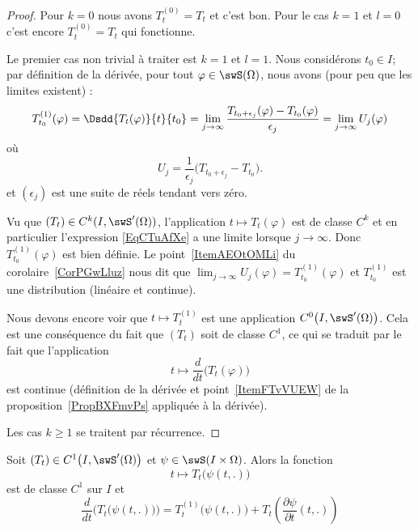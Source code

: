 \begin{proof}
    Pour \( k=0\) nous avons \( T^{(0)}_t=T_t\) et c'est bon. Pour le cas \( k=1\) et \( l=0\) c'est encore \( T_t^{(0)}=T_t\) qui fonctionne.

    Le premier cas non trivial à traiter est \( k=1\) et \( l=1\). Nous considérons \( t_0\in I\); par définition de la dérivée, pour tout \( \varphi\in\swS(\Omega)\), nous avons (pour peu que les limites existent) :
    \begin{equation}    \label{EqCTuAfXe}
        T^{(1)}_{t_0}(\varphi)=  \Dsdd{ T_t(\varphi) }{t}{t_0}=\lim_{j\to \infty} \frac{ T_{t_0+\epsilon_j}(\varphi)-T_{t_0}(\varphi) }{ \epsilon_j }= \lim_{j\to \infty} U_j(\varphi)
    \end{equation}
    où
    \begin{equation}
        U_j=\frac{1}{ \epsilon_j }\big( T_{t_0+\epsilon_j}-T_{t_0} \big).
    \end{equation}
    et \( (\epsilon_j)\) est une suite de réels tendant vers zéro.

    Vu que \( (T_t)\in C^k(I,\swS'(\Omega))\), l'application \( t\mapsto T_t(\varphi)\) est de classe \( C^k\) et en particulier l'expression \eqref{EqCTuAfXe} a une limite lorsque \( j\to \infty\). Donc \( T^{(1)}_{t_0}(\varphi)\) est bien définie. Le point~\ref{ItemAEOtOMLi} du corolaire~\ref{CorPGwLluz} nous dit que \( \lim_{j\to \infty} U_j(\varphi)= T_{t_0}^{(1)}(\varphi)\) et \( T_{t_0}^{(1)}\) est une distribution (linéaire et continue).

    Nous devons encore voir que \( t\mapsto T^{(1)}_t\) est une application \( C^0\big( I,\swS'(\Omega) \big)\). Cela est une conséquence du fait que \( (T_t)\) soit de classe \( C^1\), ce qui se traduit par le fait que l'application
    \begin{equation}
        t\mapsto \frac{ d }{ dt }\Big( T_t(\varphi) \Big)
    \end{equation}
    est continue (définition de la dérivée et point~\ref{ItemFTvVUEW} de la proposition~\ref{PropBXFmvPs} appliquée à la dérivée).

    Les cas \( k\geq 1\) se traitent par récurrence.
\end{proof}

\begin{proposition} \label{PropUDkgksG}
    Soit \( (T_t)\in C^1\big( I,\swS'(\Omega) \big)\) et \( \psi\in\swS(I\times \Omega)\). Alors la fonction
    \begin{equation}
        t\mapsto T_t\big( \psi(t,.) \big)
    \end{equation}
    est de classe \( C^1\) sur \( I\) et
    \begin{equation}    \label{EqSCNYYhE}
        \frac{ d }{ dt }\Big( T_t\big( \psi(t,.) \big) \Big)=T_t^{(1)}\big( \psi(t,.) \big)+T_t\left( \frac{ \partial \psi }{ \partial t }(t,.) \right)
    \end{equation}
\end{proposition}

